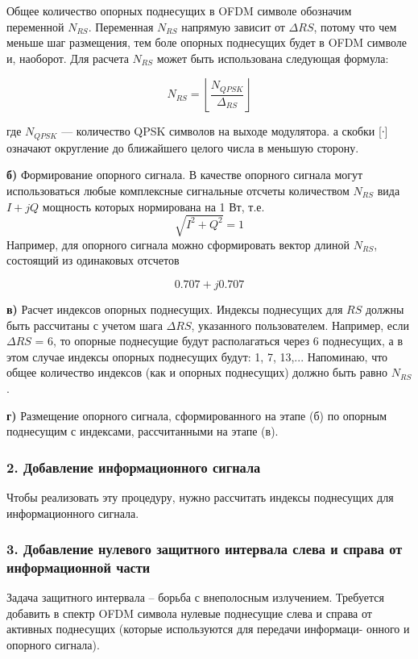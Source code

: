 Общее количество опорных поднесущих в OFDM 
символе обозначим переменной $N_{RS}$. Переменная $N_{RS}$ напрямую зависит
от $\Delta{RS}$, потому что чем меньше шаг размещения, тем боле опорных поднесущих будет в OFDM символе и, наоборот. Для расчета $N_{RS}$ может быть
использована следующая формула:

\[
N_{RS} = \left\lfloor \frac{N_{QPSK}}{\Delta_{RS}} \right\rfloor
\]

где $N_{QPSK}$ — количество QPSK символов на выходе модулятора. а скобки [∙] означают округление до ближайшего целого числа в меньшую сторону.

\textbf{б)} Формирование опорного сигнала. В качестве опорного сигнала могут использоваться любые комплексные сигнальные 
отсчеты количеством $N_{RS}$ вида 
$I + jQ$ мощность которых нормирована на 1 Вт, т.е.
\[
\sqrt{I^2 + Q^2} = 1
\]
Например, для опорного сигнала можно сформировать
вектор длиной $N_{RS}$, состоящий из одинаковых отсчетов

\[
0.707 + j0.707
\]

\textbf{в)} Расчет индексов опорных поднесущих. 
Индексы поднесущих для $RS$ должны быть рассчитаны с учетом шага $\Delta{RS}$, указанного
пользователем. Например, если $\Delta{RS}$ = 6, то опорные поднесущие будут
располагаться через 6 поднесущих, а в этом случае индексы опорных поднесущих будут: 1, 7, 13,... Напоминаю, что общее количество индексов
(как и опорных поднесущих) должно быть равно $N_{RS}$.

\textbf{г)} Размещение опорного сигнала, 
сформированного на этапе (б) по опорным поднесущим с индексами, рассчитанными на этапе (в).

\subsubsection{2. Добавление информационного сигнала}

Чтобы реализовать эту
процедуру, нужно рассчитать индексы поднесущих для информационного сигнала.

\subsubsection{3. Добавление нулевого защитного интервала слева и справа от
информационной части}

Задача защитного интервала – борьба с внеполосным излучением. Требуется
добавить в спектр OFDM символа нулевые поднесущие слева и справа от
активных поднесущих (которые используются для передачи информаци-
онного и опорного сигнала). 

